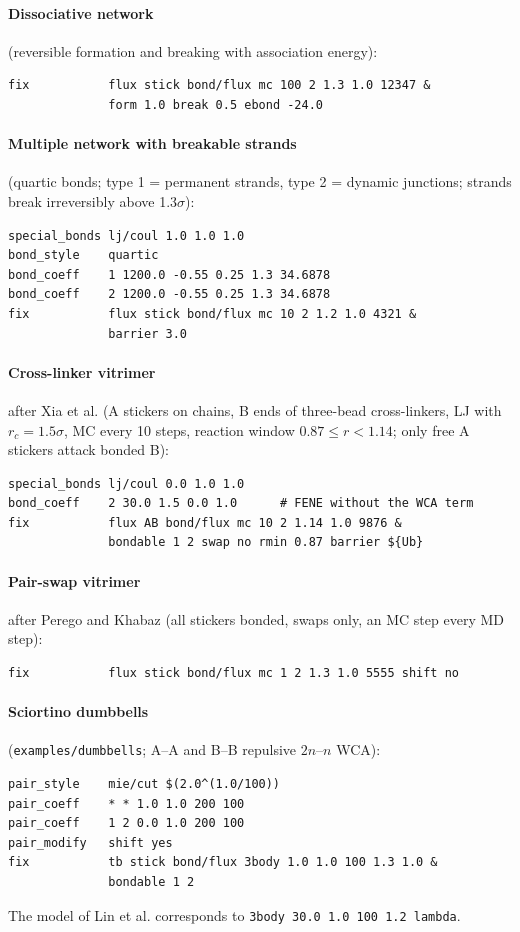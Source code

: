 \documentclass[a4paper]{tufte-handout}
\newcommand{\cmd}[1]{\texttt{#1}}
\begin{document}
\paragraph{Dissociative network} (reversible formation and breaking with association energy):
\begin{lstlisting}
fix           flux stick bond/flux mc 100 2 1.3 1.0 12347 &
              form 1.0 break 0.5 ebond -24.0
\end{lstlisting}

\paragraph{Multiple network with breakable strands} (quartic bonds; type 1 = permanent strands,
type 2 = dynamic junctions; strands break irreversibly above 1.3$\sigma$):
\begin{lstlisting}
special_bonds lj/coul 1.0 1.0 1.0
bond_style    quartic
bond_coeff    1 1200.0 -0.55 0.25 1.3 34.6878
bond_coeff    2 1200.0 -0.55 0.25 1.3 34.6878
fix           flux stick bond/flux mc 10 2 1.2 1.0 4321 &
              barrier 3.0
\end{lstlisting}

\paragraph{Cross-linker vitrimer} after Xia et al.\cite{Xia2023} (A stickers on chains, B ends of
three-bead cross-linkers, LJ with $r_c = 1.5\sigma$, MC every 10 steps, reaction window
$0.87\le r < 1.14$; only free A stickers attack bonded B):
\begin{lstlisting}
special_bonds lj/coul 0.0 1.0 1.0
bond_coeff    2 30.0 1.5 0.0 1.0      # FENE without the WCA term
fix           flux AB bond/flux mc 10 2 1.14 1.0 9876 &
              bondable 1 2 swap no rmin 0.87 barrier ${Ub}
\end{lstlisting}

\paragraph{Pair-swap vitrimer} after Perego and Khabaz (all stickers bonded, swaps only, an MC step
every MD step):
\begin{lstlisting}
fix           flux stick bond/flux mc 1 2 1.3 1.0 5555 shift no
\end{lstlisting}

\paragraph{Sciortino dumbbells} (\cmd{examples/dumbbells}; A--A and B--B repulsive $2n$--$n$ WCA):
\begin{lstlisting}
pair_style    mie/cut $(2.0^(1.0/100))
pair_coeff    * * 1.0 1.0 200 100
pair_coeff    1 2 0.0 1.0 200 100
pair_modify   shift yes
fix           tb stick bond/flux 3body 1.0 1.0 100 1.3 1.0 &
              bondable 1 2
\end{lstlisting}
The model of Lin et al. corresponds to \cmd{3body 30.0 1.0 100 1.2 lambda}.
\end{document}

